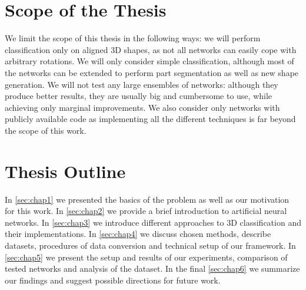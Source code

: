 \section{Scope of the Thesis}
We limit the scope of this thesis in the following ways: we will perform classification only on aligned 3D shapes, as not all networks can easily cope with arbitrary rotations. We will only consider simple classification, although most of the networks can be extended to perform part segmentation as well as new shape generation. We will not test any large ensembles of networks: although they produce better results, they are usually big and cumbersome to use, while achieving only marginal improvements. We also consider only networks with publicly available code as implementing all the different techniques is far beyond the scope of this work.

\section{Thesis Outline}
In \autoref{sec:chap1} we presented the basics of the problem as well as our motivation for this work. In \autoref{sec:chap2} we provide a brief introduction to artificial neural networks. In  \autoref{sec:chap3} we introduce different approaches to 3D classification and their implementations. In \autoref{sec:chap4} we discuss chosen methods, describe datasets, procedures of data conversion and technical setup of our framework. In  \autoref{sec:chap5} we present the setup and results of our experiments, comparison of tested networks and analysis of the dataset. In the final  \autoref{sec:chap6} we summarize our findings and suggest possible directions for future work.
